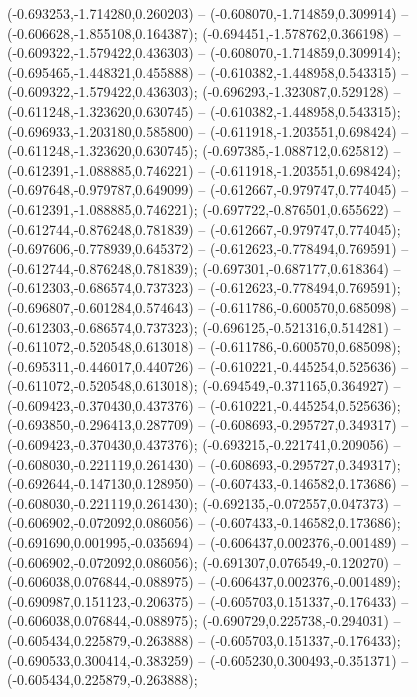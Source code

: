  (-0.693253,-1.714280,0.260203) -- (-0.608070,-1.714859,0.309914) -- (-0.606628,-1.855108,0.164387);
 (-0.694451,-1.578762,0.366198) -- (-0.609322,-1.579422,0.436303) -- (-0.608070,-1.714859,0.309914);
 (-0.695465,-1.448321,0.455888) -- (-0.610382,-1.448958,0.543315) -- (-0.609322,-1.579422,0.436303);
 (-0.696293,-1.323087,0.529128) -- (-0.611248,-1.323620,0.630745) -- (-0.610382,-1.448958,0.543315);
 (-0.696933,-1.203180,0.585800) -- (-0.611918,-1.203551,0.698424) -- (-0.611248,-1.323620,0.630745);
 (-0.697385,-1.088712,0.625812) -- (-0.612391,-1.088885,0.746221) -- (-0.611918,-1.203551,0.698424);
 (-0.697648,-0.979787,0.649099) -- (-0.612667,-0.979747,0.774045) -- (-0.612391,-1.088885,0.746221);
 (-0.697722,-0.876501,0.655622) -- (-0.612744,-0.876248,0.781839) -- (-0.612667,-0.979747,0.774045);
 (-0.697606,-0.778939,0.645372) -- (-0.612623,-0.778494,0.769591) -- (-0.612744,-0.876248,0.781839);
 (-0.697301,-0.687177,0.618364) -- (-0.612303,-0.686574,0.737323) -- (-0.612623,-0.778494,0.769591);
 (-0.696807,-0.601284,0.574643) -- (-0.611786,-0.600570,0.685098) -- (-0.612303,-0.686574,0.737323);
 (-0.696125,-0.521316,0.514281) -- (-0.611072,-0.520548,0.613018) -- (-0.611786,-0.600570,0.685098);
 (-0.695311,-0.446017,0.440726) -- (-0.610221,-0.445254,0.525636) -- (-0.611072,-0.520548,0.613018);
 (-0.694549,-0.371165,0.364927) -- (-0.609423,-0.370430,0.437376) -- (-0.610221,-0.445254,0.525636);
 (-0.693850,-0.296413,0.287709) -- (-0.608693,-0.295727,0.349317) -- (-0.609423,-0.370430,0.437376);
 (-0.693215,-0.221741,0.209056) -- (-0.608030,-0.221119,0.261430) -- (-0.608693,-0.295727,0.349317);
 (-0.692644,-0.147130,0.128950) -- (-0.607433,-0.146582,0.173686) -- (-0.608030,-0.221119,0.261430);
 (-0.692135,-0.072557,0.047373) -- (-0.606902,-0.072092,0.086056) -- (-0.607433,-0.146582,0.173686);
 (-0.691690,0.001995,-0.035694) -- (-0.606437,0.002376,-0.001489) -- (-0.606902,-0.072092,0.086056);
 (-0.691307,0.076549,-0.120270) -- (-0.606038,0.076844,-0.088975) -- (-0.606437,0.002376,-0.001489);
 (-0.690987,0.151123,-0.206375) -- (-0.605703,0.151337,-0.176433) -- (-0.606038,0.076844,-0.088975);
 (-0.690729,0.225738,-0.294031) -- (-0.605434,0.225879,-0.263888) -- (-0.605703,0.151337,-0.176433);
 (-0.690533,0.300414,-0.383259) -- (-0.605230,0.300493,-0.351371) -- (-0.605434,0.225879,-0.263888);
